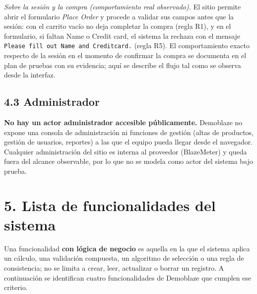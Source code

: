 \noindent\emph{Sobre la sesión y la compra (comportamiento real observado).} El sitio
permite abrir el formulario \emph{Place Order} y procede a validar sus campos antes que
la sesión: con el carrito vacío no deja completar la compra (regla R1), y en el
formulario, si faltan Name o Credit card, el sistema la rechaza con el mensaje
\texttt{Please fill out Name and Creditcard.} (regla R5). El comportamiento exacto
respecto de la sesión en el momento de confirmar la compra se documenta en el plan de
pruebas con su evidencia; aquí se describe el flujo tal como se observa desde la
interfaz.

\subsection*{4.3 Administrador}

\textbf{No hay un actor administrador accesible públicamente.} Demoblaze no expone una
consola de administración ni funciones de gestión (altas de productos, gestión de
usuarios, reportes) a las que el equipo pueda llegar desde el navegador. Cualquier
administración del sitio es interna al proveedor (BlazeMeter) y queda fuera del alcance
observable, por lo que no se modela como actor del sistema bajo prueba.

\FloatBarrier
\section*{5. Lista de funcionalidades del sistema}

Una funcionalidad \textbf{con lógica de negocio} es aquella en la que el sistema aplica
un cálculo, una validación compuesta, un algoritmo de selección o una regla de
consistencia; no se limita a crear, leer, actualizar o borrar un registro. A
continuación se identifican cuatro funcionalidades de Demoblaze que cumplen ese
criterio.

